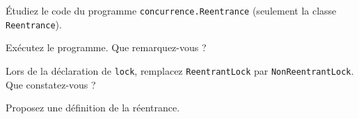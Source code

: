 
\begingroup

\begin{exercice}[Réentrance]

  Étudiez le code du programme \texttt{concurrence.Reentrance} (seulement la classe \texttt{Reentrance}).

  \begin{questions} 
  \item Exécutez le programme. Que remarquez-vous ?
  \item Lors de la déclaration de \lstinline{lock}, remplacez \lstinline{ReentrantLock} par \lstinline{NonReentrantLock}. Que constatez-vous ?
  \item Proposez une définition de la réentrance.
  \end{questions}

\end{exercice}

\endgroup
\endinput
